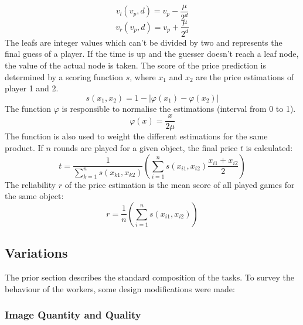 \begin{equation}
v_l(v_p,d) = v_p - \frac{\mu}{2^d}
\end{equation}
\begin{equation}
v_r(v_p,d) = v_p + \frac{\mu}{2^d}
\end{equation}
The leafs are integer values which can't be divided by two and represents the final guess of a player. If the time is up and the guesser doesn't reach a leaf node, the value of the actual node is taken. 
The score of the price prediction is determined by a scoring function \( s \), where \( x_1 \) and \( x_2 \) are the price estimations of player 1 and 2.
\begin{equation}
s(x_1,x_2) = 1 - |\varphi(x_1) - \varphi(x_2)|
\end{equation}
The function \( \varphi \) is responsible to normalise the estimations (interval from 0 to 1).
\begin{equation}
\varphi(x) = \frac{x}{2\mu}
\end{equation}
The function is also used to weight the different estimations for the same product. If \( n \) rounds are played for a given object, the final price \( t \) is calculated:
\begin{equation}
t = \frac{1}{\sum_{k=1}^{n} s(x_{k1},x_{k2})}\left(\sum_{i=1}^{n} s(x_{i1},x_{i2})\frac{x_{i1}+x_{i2}}{2}\right)
\end{equation}
The reliability \( r \) of the price estimation is the mean score of all played games for the same object:
\begin{equation}
r = \frac{1}{n}\left(\sum_{i=1}^{n} s(x_{i1},x_{i2})\right)
\end{equation}

\subsection{Variations}
The prior section describes the standard composition of the tasks. To survey the behaviour of the workers, some design modifications were made: 
\subsubsection{Image Quantity and Quality}

